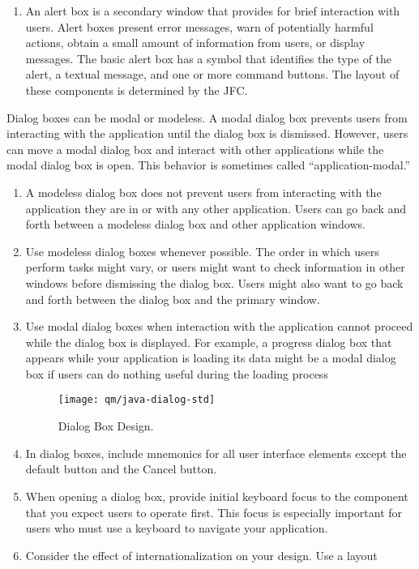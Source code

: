 \begin{enumerate}
\begin{enumerate}
\item An alert box is a secondary window that provides for brief interaction
  with users. Alert boxes present error messages, warn of potentially harmful
  actions, obtain a small amount of information from users, or display
  messages. The basic alert box has a symbol that identifies the type of the
  alert, a textual message, and one or more command buttons. The layout of
  these components is determined by the JFC.
\setcounter{saveenum}{\value{enumii}}
\end{enumerate}
\newslide
Dialog boxes can be modal or modeless. A modal dialog box prevents users from
interacting with the application until the dialog box is dismissed. However,
users can move a modal dialog box and interact with other applications while
the modal dialog box is open. This behavior is sometimes called
``application-modal.''
\begin{enumerate}
\setcounter{enumii}{\value{saveenum}}
\item A modeless dialog box does not prevent users from interacting with the
application they are in or with any other application. Users can go back and
forth between a modeless dialog box and other application windows.
\item Use modeless dialog boxes whenever possible. The order in which users
 perform
 tasks might vary, or users might want to check information in other windows
 before dismissing the dialog box. Users might also want to go back and forth
 between the dialog box and the primary window.
\item Use modal dialog boxes when interaction with the application cannot
 proceed
 while the dialog box is displayed. For example, a progress dialog box that
 appears while your application is loading its data might be a modal dialog
 box if users can do nothing useful during the loading process
%
\begin{figure}[H]
\texttt{[image: qm/java-dialog-std]}
\ifslides
\else
\caption{Dialog Box Design.}
\fi
\end{figure}
%
\item In dialog boxes, include mnemonics for all user interface elements
  except the default button and the Cancel button.
\item When opening a dialog box, provide initial keyboard focus to the
  component that you expect users to operate first. This focus is especially
  important for users who must use a keyboard to navigate your application.
\item Consider the effect of internationalization on your design. Use a layout

\end{enumerate}
\end{enumerate}
